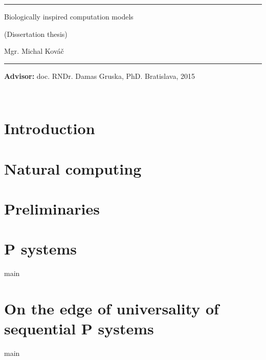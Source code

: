 \documentclass[12pt,oneside,openany,pagenumber=footcenter]{book}
\def\mftitlea{Biologically inspired computation models}
\def\mfthesistype{Dissertation thesis}
\def\mfauthor{Mgr. Michal Kováč}
\def\mfadvisor{doc. RNDr. Damas Gruska, PhD.}
\def\mfplacedate{Bratislava, 2015}
\begin{document}
\vfill
\begin{center}
\begin{minipage}{0.8\textwidth}
\hrule
\bigskip\bigskip
\centerline{\LARGE\sc\mftitlea}
\smallskip
\centerline{(\mfthesistype)}
\bigskip
\bigskip
\centerline{\large\sc\mfauthor}
\bigskip\bigskip
\hrule
\end{minipage}
\end{center}
\vfill
{\bf Advisor:} \mfadvisor
\hfill\mfplacedate
\eject
\eject

\thispagestyle{empty}
{~}\vspace{12cm}




\tableofcontents{}
\listoffigures{}

\mainmatter

\chapter*{Introduction} %
\label{cha:introduction}



\chapter{Natural computing} %
\label{cha:natural_computing}



\chapter{Preliminaries} %
\label{cha:preliminaries}



\chapter{P systems} %
\label{cha:p_systems}
{main}


\chapter{On the edge of universality of sequential P systems} %
\label{cha:on_the_edge_of_universality_of_sequential_p_systems}

{main}
\end{document}

